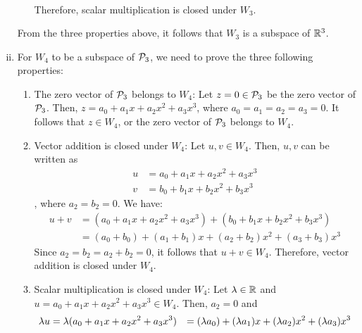 \begin{sol}
\begin{enumerate}[(i)]
\begin{enumerate}[(1)]
\[\begin{aligned}
                            \end{aligned}
                        \]
                        Therefore, scalar multiplication is closed under $W_3$.
              \end{enumerate}
              From the three properties above, it follows that $W_3$ is a subspace of $\R^{3}$.
        \item For $W_4$ to be a subspace of $\P_3$, we need to prove the three following properties:
              \begin{enumerate}[(1)]
                  \item The zero vector of $\P_3$ belongs to $W_4$: Let $z=0\in\P_3$ be the zero vector of $\P_3$. Then, $z=a_0+a_1x+a_2x^{2}+a_3x^{3}$, where $a_0=a_1=a_2=a_3=0$. It follows that $z\in W_4$, or the zero vector of $\P_3$ belongs to $W_4$.
                  \item Vector addition is closed under $W_4$: Let $u,v\in W_4$. Then, $u, v$ can be written as
                        \[
                            \begin{aligned}
                                u & = a_0+a_1x+a_2x^{2}+a_3x^{3} \\
                                v & = b_0+b_1x+b_2x^{2}+b_3x^{3}
                            \end{aligned}
                        \]
                        , where $a_2=b_2=0$. We have:
                        \[
                            \begin{aligned}
                                u+v & = (a_0+a_1x+a_2x^{2}+a_3x^{3})+(b_0+b_1x+b_2x^{2}+b_3x^{3}) \\
                                    & = (a_0+b_0)+(a_1+b_1)x+(a_2+b_2)x^{2}+(a_3+b_3)x^{3}
                            \end{aligned}
                        \]
                        Since $a_2=b_2=a_2+b_2=0$, it follows that $u+v\in W_4$. Therefore, vector addition is closed under $W_4$.
                  \item Scalar multiplication is closed under $W_4$: Let $\lam\in\R$ and $u=a_0+a_1x+a_2x^{2}+a_3x^{3}\in W_4$. Then, $a_2=0$ and
                        \[
                            \begin{aligned}
                                \lam u & = \lam(a_0+a_1x+a_2x^{2}+a_3x^{3})
                                       & = (\lam a_0)+(\lam a_1)x+(\lam a_2)x^{2}+(\lam a_3)x^{3}
                            \end{aligned}
\]
\end{enumerate}
\end{enumerate}
\end{sol}

